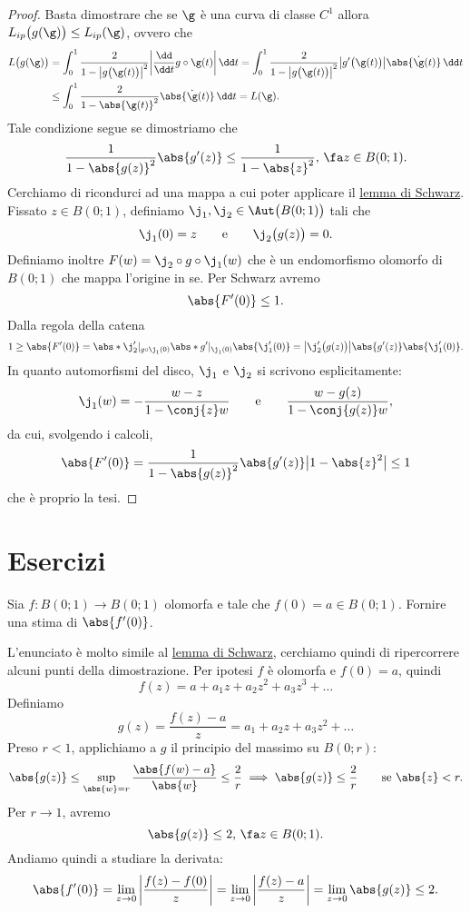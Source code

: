 \begin{proof}
	Basta dimostrare che se \(\g\) è una curva di classe \(C^1\) allora \(L_{ip}\big(g(\g)\big)\le L_{ip}(\g)\), ovvero che
	\[
		\begin{split}
			L\big(g(\g)\big) & = \int_0^1 \frac{2}{1-\big\lvert g\big(\g(t)\big)\big\rvert^2} \bigg\lvert \frac{\dd}{\dd t}g\circ \g(t) \bigg\rvert\,\dd t = \int_0^1 \frac{2}{1-\big\lvert g\big(\g(t)\big)\big\rvert^2} \big\lvert g'\big(\g(t)\big) \big\rvert \abs{\dot{\g}(t)}\,\dd t\\
			& \le \int_0^1 \frac{2}{1-\abs{\g(t)}^2}\abs{\dot{\g}(t)}\,\dd t = L(\g).
		\end{split}
	\]
	Tale condizione segue se dimostriamo che
	\[
		\frac{1}{1-\abs{g(z)}^2}\abs{g'(z)} \le \frac{1}{1-\abs{z}^2},\,\fa z\in B(0;1).
	\]
	Cerchiamo di ricondurci ad una mappa a cui poter applicare il \hyperref[th:lemmaSchwarz]{lemma di Schwarz}.
	Fissato \(z\in B(0;1)\), definiamo \(\j_1,\j_2\in\Aut\big(B(0;1)\big)\) tali che
	\[
		\j_1(0) = z \qquad\text{e}\qquad \j_2\big(g(z)\big)=0.
	\]
	Definiamo inoltre \(F(w)=\j_2\circ g\circ \j_1(w)\) che è un endomorfismo olomorfo di \(B(0;1)\) che mappa l'origine in se.
	Per Schwarz avremo
	\[
		\abs{F'(0)} \le 1.
	\]
	Dalla regola della catena
	\[
		1 \ge \abs{F'(0)} = \abs*{\j_2'|_{g\circ \j_1(0)}}\abs*{g'|_{\j_1(0)}}\abs{\j_1'(0)} = \big\lvert \j_2'\big(g(z)\big) \big\rvert \abs{g'(z)}\abs{\j_1'(0)}.
	\]
	In quanto automorfismi del disco, \(\j_1\) e \(\j_2\) si scrivono esplicitamente:
	\[
		\j_1(w) = -\frac{w-z}{1-\conj{z}w} \qquad\text{e}\qquad \frac{w-g(z)}{1-\conj{g(z)}w},
	\]
	da cui, svolgendo i calcoli,
	\[
		\abs{F'(0)} = \frac{1}{1-\abs{g(z)}^2}\abs{g'(z)} \big\lvert 1-\abs{z}^2 \big\rvert \le 1
	\]
	che è proprio la tesi.
\end{proof}
\section{Esercizi}

\begin{exeN}
	Sia \(f\colon B(0;1) \to B(0;1)\) olomorfa e tale che \(f(0)=a\in B(0;1)\).
	Fornire una stima di \(\abs{f'(0)}\).
\end{exeN}

\begin{sol}
	L'enunciato è molto simile al \hyperref[th:lemmaSchwarz]{lemma di Schwarz}, cerchiamo quindi di ripercorrere alcuni punti della dimostrazione.
	Per ipotesi \(f\) è olomorfa e \(f(0)=a\), quindi
	\[
		f(z) = a+a_1 z + a_2 z^2 + a_3 z^3 + \ldots
	\]
	Definiamo
	\[
		g(z) = \frac{f(z)-a}{z} = a_1 + a_2 z + a_3 z^2 + \ldots
	\]
	Preso \(r<1\), applichiamo a \(g\) il principio del massimo su \(B(0;r)\):
	\[
		\abs{g(z)} \le \sup_{\abs{w}=r} \frac{\abs{f(w)-a}}{\abs{w}} \le \frac{2}{r} \implies \abs{g(z)} \le \frac{2}{r} \qquad\text{se }\abs{z}<r.
	\]
	Per \(r\to 1\), avremo
	\[
		\abs{g(z)} \le 2,\,\fa z \in B(0;1).
	\]
	Andiamo quindi a studiare la derivata:
	\[
		\abs{f'(0)} = \lim_{z\to 0} \bigg\lvert \frac{f(z)-f(0)}{z} \bigg\rvert = \lim_{z \to 0} \bigg\lvert \frac{f(z)-a}{z} \bigg\rvert = \lim_{z \to 0} \abs{g(z)} \le 2.
	\]
\end{sol}

